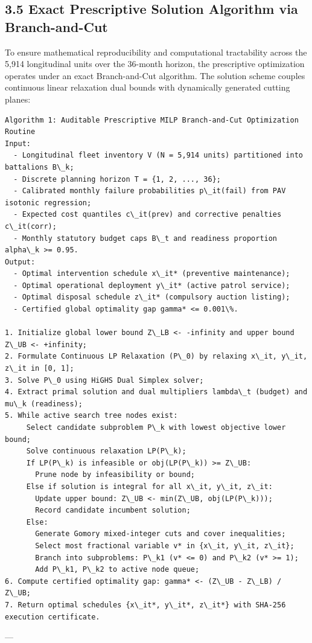 \documentclass[10pt,a4paper,journal]{article}
\begin{document}
\subsection{3.5 Exact Prescriptive Solution Algorithm via Branch-and-Cut}
To ensure mathematical reproducibility and computational tractability across the 5,914 longitudinal units over the 36-month horizon, the prescriptive optimization operates under an exact Branch-and-Cut algorithm. The solution scheme couples continuous linear relaxation dual bounds with dynamically generated cutting planes:

\begin{verbatim}
Algorithm 1: Auditable Prescriptive MILP Branch-and-Cut Optimization Routine
Input:
  - Longitudinal fleet inventory V (N = 5,914 units) partitioned into battalions B\_k;
  - Discrete planning horizon T = {1, 2, ..., 36};
  - Calibrated monthly failure probabilities p\_it(fail) from PAV isotonic regression;
  - Expected cost quantiles c\_it(prev) and corrective penalties c\_it(corr);
  - Monthly statutory budget caps B\_t and readiness proportion alpha\_k >= 0.95.
Output:
  - Optimal intervention schedule x\_it* (preventive maintenance);
  - Optimal operational deployment y\_it* (active patrol service);
  - Optimal disposal schedule z\_it* (compulsory auction listing);
  - Certified global optimality gap gamma* <= 0.001\%.

1. Initialize global lower bound Z\_LB <- -infinity and upper bound Z\_UB <- +infinity;
2. Formulate Continuous LP Relaxation (P\_0) by relaxing x\_it, y\_it, z\_it in [0, 1];
3. Solve P\_0 using HiGHS Dual Simplex solver;
4. Extract primal solution and dual multipliers lambda\_t (budget) and mu\_k (readiness);
5. While active search tree nodes exist:
     Select candidate subproblem P\_k with lowest objective lower bound;
     Solve continuous relaxation LP(P\_k);
     If LP(P\_k) is infeasible or obj(LP(P\_k)) >= Z\_UB:
       Prune node by infeasibility or bound;
     Else if solution is integral for all x\_it, y\_it, z\_it:
       Update upper bound: Z\_UB <- min(Z\_UB, obj(LP(P\_k)));
       Record candidate incumbent solution;
     Else:
       Generate Gomory mixed-integer cuts and cover inequalities;
       Select most fractional variable v* in {x\_it, y\_it, z\_it};
       Branch into subproblems: P\_k1 (v* <= 0) and P\_k2 (v* >= 1);
       Add P\_k1, P\_k2 to active node queue;
6. Compute certified optimality gap: gamma* <- (Z\_UB - Z\_LB) / Z\_UB;
7. Return optimal schedules {x\_it*, y\_it*, z\_it*} with SHA-256 execution certificate.
\end{verbatim}
---
\end{document}
